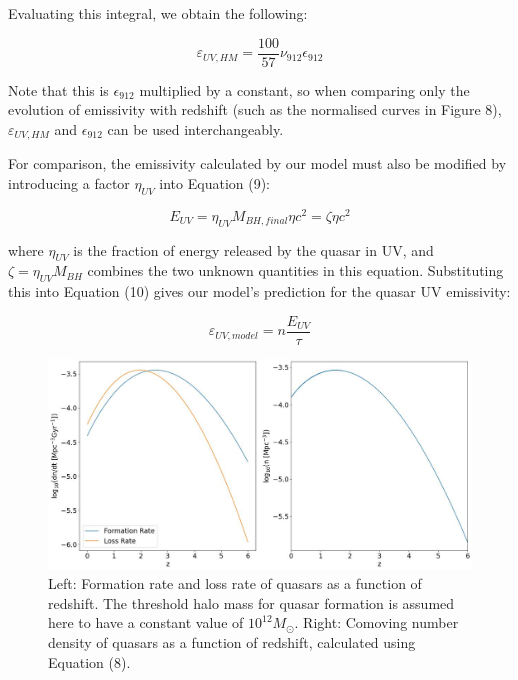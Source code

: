 \documentclass[12pt, twocolumn]{article}%
\begin{document}
\noindent Evaluating this integral, we obtain the following:

\begin{equation}
    \varepsilon_{UV,HM}=\frac{100}{57}\nu_{912}\epsilon_{912}
\end{equation}

\noindent Note that this is $\epsilon_{912}$ multiplied by a constant, so when comparing only the evolution of emissivity with redshift (such as the normalised curves in Figure 8), $\varepsilon_{UV,HM}$ and $\epsilon_{912}$ can be used interchangeably.\par

For comparison, the emissivity calculated by our model must also be modified by introducing a factor $\eta_{UV}$ into Equation (9):

\begin{equation}
    E_{UV}=\eta_{UV}M_{BH,final}\eta c^2=\zeta\eta c^2
\end{equation}

\noindent where $\eta_{UV}$ is the fraction of energy released by the quasar in UV, and $\zeta=\eta_{UV}M_{BH}$ combines the two unknown quantities in this equation. Substituting this into Equation (10) gives our model's prediction for the quasar UV emissivity:

\begin{equation}
    \varepsilon_{UV,model}=n\frac{E_{UV}}{\tau}
\end{equation}

\clearpage

\onecolumngrid


\begin{figure}[H]
\centering
\includegraphics[width=\linewidth]{Plot_7_2.jpeg}
\caption{Left: Formation rate and loss rate of quasars as a function of redshift. The threshold halo mass for quasar formation is assumed here to have a constant value of $10^{12}M_\odot$. Right: Comoving number density of quasars as a function of redshift, calculated using Equation (8).}
\label{fig:7}
\end{figure}
\end{document}
